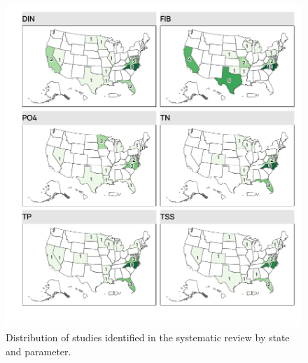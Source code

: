 \documentclass[utf8]{FrontiersinHarvard}
\begin{document}
\begin{figure}[p]
\includegraphics[width=1\linewidth,]{../figures/study_map} \caption{Distribution of studies identified in the systematic review by state and parameter.}\label{fig:studymap}
\end{figure}
\end{document}
